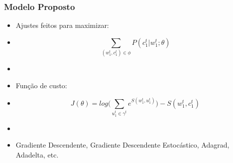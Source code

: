 \documentclass[10pt]{beamer}
\begin{document}
\begin{frame}[fragile]
\frametitle{Modelo Proposto}
  
  \begin{itemize}

    \item Ajustes feitos para maximizar:

    \item[\ ] \begin{equation}
    \sum\limits_{(w_1^t,c_1^t) \in \phi} P(c_1^t|w_1^t;\theta) \nonumber
    \end{equation}

    \item[\ ] \ 

    \item Função de custo:

    \item[\ ] \begin{equation}
    J(\theta) = log\Bigg(\sum\limits_{u_1^t \in \gamma^t} e^{S(w_1^t, u_1^t)} \Bigg) - S(w_1^t, c_1^t) \nonumber
    \end{equation}

    \item[\ ] \ 

    \item Gradiente Descendente, Gradiente Descendente Estocástico, Adagrad, Adadelta, etc. \cite{Bengio-et-al-2015-Book}

  \end{itemize}


\end{frame}
\end{document}
